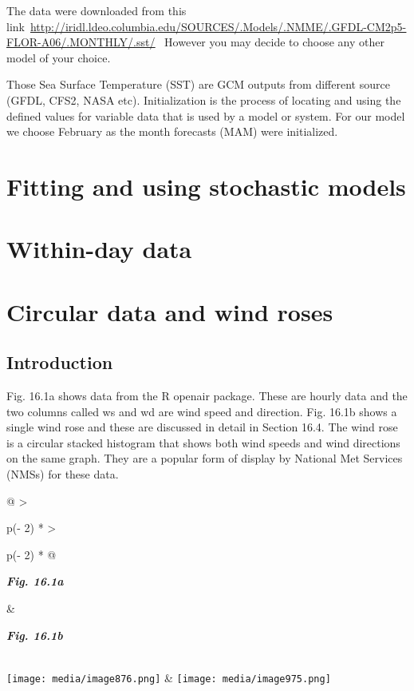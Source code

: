 \documentclass[
  letterpaper,
  DIV=11,
  numbers=noendperiod]{scrreprt}
\begin{document}
The data were downloaded from this
link~\href{http://iridl.ldeo.columbia.edu/SOURCES/.Models/.NMME/.GFDL-CM2p5-FLOR-A06/.MONTHLY/.sst/}{\ul{http://iridl.ldeo.columbia.edu/SOURCES/.Models/.NMME/.GFDL-CM2p5-FLOR-A06/.MONTHLY/.sst/}}~
However you may decide to choose any other model of your choice.~~

Those Sea Surface Temperature (SST) are GCM outputs from different
source (GFDL, CFS2, NASA etc). Initialization is the process of locating
and using the defined values for variable data that is used by a model
or system. For our model we choose February as the month forecasts (MAM)
were initialized.


\chapter{Fitting and using stochastic
models}\label{fitting-and-using-stochastic-models}


\chapter{Within-day data}\label{within-day-data}


\chapter{Circular data and wind
roses}\label{circular-data-and-wind-roses}

\section{Introduction}\label{introduction-13}

Fig. 16.1a shows data from the R openair package. These are hourly data
and the two columns called ws and wd are wind speed and direction. Fig.
16.1b shows a single wind rose and these are discussed in detail in
Section 16.4. The wind rose is a circular stacked histogram that shows
both wind speeds and wind directions on the same graph. They are a
popular form of display by National Met Services (NMSs) for these data.

\begin{longtable}[]{@{}
  >{\raggedright\arraybackslash}p{(\columnwidth - 2\tabcolsep) * }
  >{\raggedright\arraybackslash}p{(\columnwidth - 2\tabcolsep) * }@{}}
\toprule\noalign{}
\begin{minipage}[b]{\linewidth}\raggedright
\textbf{\emph{Fig. 16.1a}}
\end{minipage} & \begin{minipage}[b]{\linewidth}\raggedright
\textbf{\emph{Fig. 16.1b}}
\end{minipage} \\
\midrule\noalign{}
\endhead
\bottomrule\noalign{}
\endlastfoot
\texttt{[image: media/image876.png]} &
\texttt{[image: media/image975.png]} \\
\end{longtable}
\end{document}
